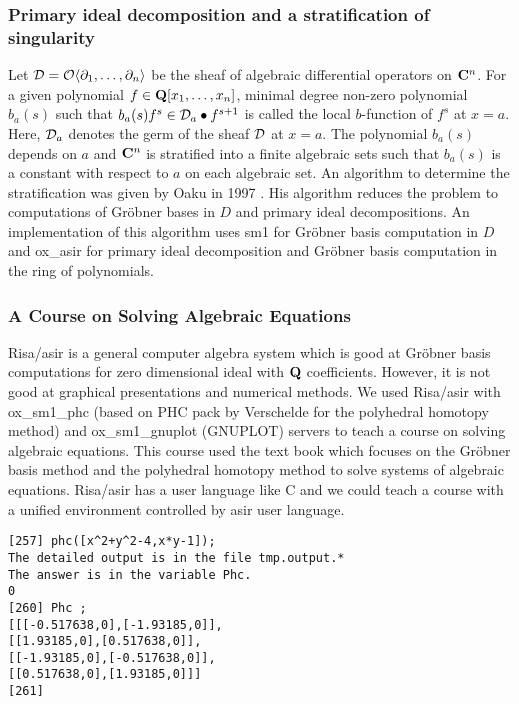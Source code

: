 \subsubsection{Primary ideal decomposition and
a stratification of singularity}
Let ${\cal D} = {\cal O}\langle \partial_{1}, \ldots, \partial_{n} \rangle$
be the sheaf of algebraic differential operators on ${\bf C}^n$.
For a given polynomial
$f \in {\bf Q}[x_1, \ldots, x_n]$,
minimal degree non-zero polynomial $b_a(s)$ such that
$ b_a(s) f^s \in {\cal D}_{a} \bullet f^{s+1} $
is called the local $b$-function of $f^s$ at
$x=a$.
Here, ${\cal D}_a$ denotes the germ of the sheaf ${\cal D}$ at
$x=a$.
The polynomial $b_a(s)$ depends on $a$ and ${\bf C}^n$ is
stratified into a finite algebraic sets such that
$b_a(s)$ is a constant with respect to $a$ on each 
algebraic set.
An algorithm to determine the stratification
was given by Oaku in 1997 \cite{oaku-advance}.
His algorithm reduces the problem to computations of Gr\"obner bases
in $D$ and primary ideal decompositions.
An implementation of this algorithm 
uses sm1 for Gr\"obner basis computation in $D$ and 
ox\_asir for primary ideal decomposition and Gr\"obner basis computation
in the ring of polynomials.

\subsubsection{A Course on Solving Algebraic Equations}

Risa/asir \cite{asir} is a general computer algebra system
which is good at Gr\"obner basis computations for zero dimensional ideal
with ${\bf Q}$ coefficients.
However, it is not good at graphical presentations and
numerical methods.
We used Risa/asir with ox\_sm1\_phc (based on PHC pack by Verschelde \cite{phc}
for the polyhedral homotopy method) and
ox\_sm1\_gnuplot (GNUPLOT) servers
to teach a course on solving algebraic equations.
This course used the text book \cite{CLO} which focuses
on the Gr\"obner basis method and the polyhedral homotopy method
to solve systems of algebraic equations.
Risa/asir has a user language like C and we could teach a course
with a unified environment
controlled by asir user language.
\begin{verbatim}
[257] phc([x^2+y^2-4,x*y-1]);
The detailed output is in the file tmp.output.*
The answer is in the variable Phc.
0
[260] Phc ;
[[[-0.517638,0],[-1.93185,0]],
[[1.93185,0],[0.517638,0]],
[[-1.93185,0],[-0.517638,0]],
[[0.517638,0],[1.93185,0]]]
[261] 
\end{verbatim}



